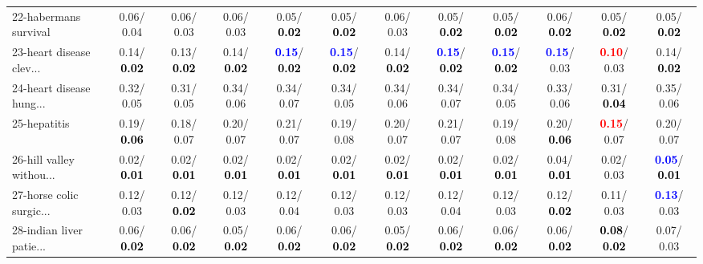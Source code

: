 \begin{table}[h]
\begin{center}
{\begin{tabular}{lc|c|c|c|c|c|c|c|c|c|c}
22-habermans survival &   0.06/  0.04 &   0.06/  0.03 &   0.06/  0.03 &   0.05/\textcolor{black}{\textbf{  0.02}} &   0.05/\textcolor{black}{\textbf{  0.02}} &   0.06/  0.03 &   0.05/\textcolor{black}{\textbf{  0.02}} &   0.05/\textcolor{black}{\textbf{  0.02}} &   0.06/\textcolor{black}{\textbf{  0.02}} &   0.05/\textcolor{black}{\textbf{  0.02}} &   0.05/\textcolor{black}{\textbf{  0.02}} \\
23-heart disease clev... &   0.14/\textcolor{black}{\textbf{  0.02}} &   0.13/\textcolor{black}{\textbf{  0.02}} &   0.14/\textcolor{black}{\textbf{  0.02}} & \textcolor{blue}{\textbf{  0.15}}/\textcolor{black}{\textbf{  0.02}} & \textcolor{blue}{\textbf{  0.15}}/\textcolor{black}{\textbf{  0.02}} &   0.14/\textcolor{black}{\textbf{  0.02}} & \textcolor{blue}{\textbf{  0.15}}/\textcolor{black}{\textbf{  0.02}} & \textcolor{blue}{\textbf{  0.15}}/\textcolor{black}{\textbf{  0.02}} & \textcolor{blue}{\textbf{  0.15}}/  0.03 & \textcolor{red}{\textbf{  0.10}}/  0.03 &   0.14/\textcolor{black}{\textbf{  0.02}} \\
24-heart disease hung... &   0.32/  0.05 &   0.31/  0.05 &   0.34/  0.06 &   0.34/  0.07 &   0.34/  0.05 &   0.34/  0.06 &   0.34/  0.07 &   0.34/  0.05 &   0.33/  0.06 &   0.31/\textcolor{black}{\textbf{  0.04}} &   0.35/  0.06 \\
25-hepatitis &   0.19/\textcolor{black}{\textbf{  0.06}} &   0.18/  0.07 &   0.20/  0.07 &   0.21/  0.07 &   0.19/  0.08 &   0.20/  0.07 &   0.21/  0.07 &   0.19/  0.08 &   0.20/\textcolor{black}{\textbf{  0.06}} & \textcolor{red}{\textbf{  0.15}}/  0.07 &   0.20/  0.07 \\
26-hill valley withou... &   0.02/\textcolor{black}{\textbf{  0.01}} &   0.02/\textcolor{black}{\textbf{  0.01}} &   0.02/\textcolor{black}{\textbf{  0.01}} &   0.02/\textcolor{black}{\textbf{  0.01}} &   0.02/\textcolor{black}{\textbf{  0.01}} &   0.02/\textcolor{black}{\textbf{  0.01}} &   0.02/\textcolor{black}{\textbf{  0.01}} &   0.02/\textcolor{black}{\textbf{  0.01}} &   0.04/\textcolor{black}{\textbf{  0.01}} &   0.02/  0.03 & \textcolor{blue}{\textbf{  0.05}}/\textcolor{black}{\textbf{  0.01}} \\
27-horse colic surgic... &   0.12/  0.03 &   0.12/\textcolor{black}{\textbf{  0.02}} &   0.12/  0.03 &   0.12/  0.04 &   0.12/  0.03 &   0.12/  0.03 &   0.12/  0.04 &   0.12/  0.03 &   0.12/\textcolor{black}{\textbf{  0.02}} &   0.11/  0.03 & \textcolor{blue}{\textbf{  0.13}}/  0.03 \\
28-indian liver patie... &   0.06/\textcolor{black}{\textbf{  0.02}} &   0.06/\textcolor{black}{\textbf{  0.02}} &   0.05/\textcolor{black}{\textbf{  0.02}} &   0.06/\textcolor{black}{\textbf{  0.02}} &   0.06/\textcolor{black}{\textbf{  0.02}} &   0.05/\textcolor{black}{\textbf{  0.02}} &   0.06/\textcolor{black}{\textbf{  0.02}} &   0.06/\textcolor{black}{\textbf{  0.02}} &   0.06/\textcolor{black}{\textbf{  0.02}} & \textcolor{black}{\textbf{  0.08}}/\textcolor{black}{\textbf{  0.02}} &   0.07/  0.03 \\ \hline

\end{tabular}}
\end{center}
\end{table}
